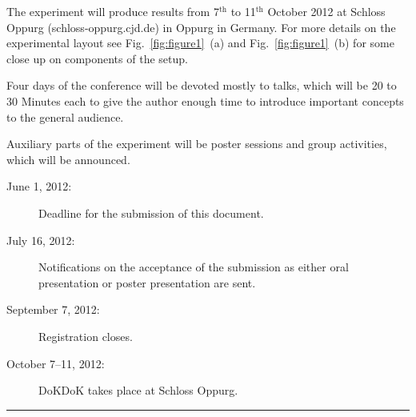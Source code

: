 \documentclass[a4paper, 11pt]{article}
\begin{document}
\begin{multicols}{2}

The experiment will produce results from 7$^\text{th}$ to 11$^\text{th}$ October 2012 at Schloss Oppurg (schloss-oppurg.cjd.de) in Oppurg in Germany. For more details on the experimental layout see Fig.~\ref{fig:figure1}~(a) and Fig.~\ref{fig:figure1}~(b) for some close up on components of the setup.

Four days of the conference will be devoted mostly to talks, which will be 20 to 30 Minutes each to give the author enough time to introduce important concepts \cite{ Service2010, Ryskin2010, Evans2011, Nifenecker2011, Zayats2005, Novotny1994} to the general audience.

Auxiliary parts of the experiment will be poster sessions and group activities, which will be announced.


\begin{description}
	\item[June 1, 2012:] Deadline for the submission of this document.
	\item[July 16, 2012:] Notifications on the acceptance of the submission as either oral presentation or poster presentation are sent.
	\item[September 7, 2012:] Registration closes.
	\item[October 7--11, 2012:] DoKDoK takes place at Schloss Oppurg.
\end{description}

\end{multicols}

\begin{center}
\rule{0.75\textwidth}{1pt}
\end{center}








%
%
%
%
%
%
%
%
\end{document}
